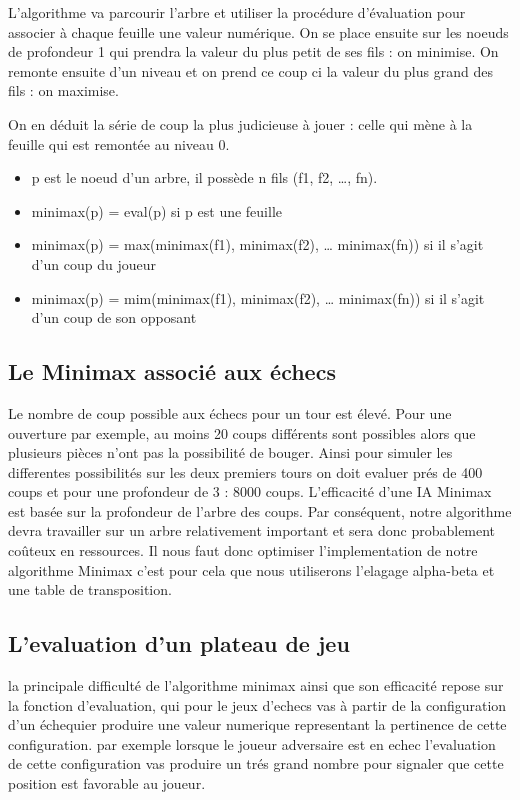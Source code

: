 \documentclass[12pt]{article}
\begin{document}
L'algorithme va parcourir l'arbre et utiliser la procédure d'évaluation
pour associer à chaque feuille une valeur numérique. On se place ensuite
sur les noeuds de profondeur 1 qui prendra la valeur du plus petit de
ses fils : on minimise. On remonte ensuite d'un niveau et on prend ce
coup ci la valeur du plus grand des fils : on maximise.

On en déduit la série de coup la plus judicieuse à jouer : celle qui
mène à la feuille qui est remontée au niveau 0.

\begin{itemize}
\item
  p est le noeud d'un arbre, il possède n fils (f1, f2, \ldots{}, fn).
\item
  minimax(p) = eval(p) si p est une feuille
\item
  minimax(p) = max(minimax(f1), minimax(f2), \ldots{} minimax(fn)) si il
  s'agit d'un coup du joueur
\item
  minimax(p) = mim(minimax(f1), minimax(f2), \ldots{} minimax(fn)) si il
  s'agit d'un coup de son opposant
\end{itemize}

\subsection{Le Minimax associé aux
échecs}\label{le-minimax-associuxe9-aux-uxe9checs}

Le nombre de coup possible aux échecs pour un tour est élevé. Pour une
ouverture par exemple, au moins 20 coups différents sont possibles alors
que plusieurs pièces n'ont pas la possibilité de bouger. Ainsi pour
simuler les differentes possibilités sur les deux premiers tours on doit
evaluer prés de 400 coups et pour une profondeur de 3 : 8000 coups.
L'efficacité d'une IA Minimax est basée sur la profondeur de l'arbre des
coups. Par conséquent, notre algorithme devra travailler sur un arbre
relativement important et sera donc probablement coûteux en ressources.
Il nous faut donc optimiser l'implementation de notre algorithme Minimax
c'est pour cela que nous utiliserons l'elagage alpha-beta et une table
de transposition.

\subsection{L'evaluation d'un plateau de
jeu}\label{levaluation-dun-plateau-de-jeu}

la principale difficulté de l'algorithme minimax ainsi que son
efficacité repose sur la fonction d'evaluation, qui pour le jeux
d'echecs vas à partir de la configuration d'un échequier produire une
valeur numerique representant la pertinence de cette configuration. par
exemple lorsque le joueur adversaire est en echec l'evaluation de cette
configuration vas produire un trés grand nombre pour signaler que cette
position est favorable au joueur.
\end{document}
